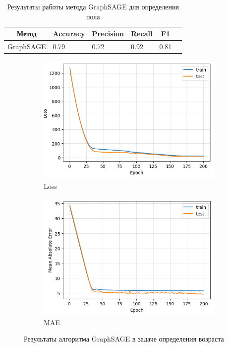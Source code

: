 \begin{table}[t]
\centering
\begin{tabular}{|l|l|l|l|l|l|}
\hline
\multicolumn{1}{|c|}{\textbf{Метод}} & \multicolumn{1}{c|}{\textbf{Accuracy}} & \multicolumn{1}{c|}{\textbf{Precision}} & \multicolumn{1}{c|}{\textbf{Recall}} & \multicolumn{1}{c|}{\textbf{F1}}  \\ \hline
GraphSAGE                       & 0.79                                        &           0.72                              &      0.92                                &     0.81                          \\ \hline

\end{tabular}
\caption{Результаты работы метода GraphSAGE для определения пола}
\label{graphsage gender table}
\end{table}

\begin{figure}[h!]
\begin{subfigure}[h]{0.5\linewidth}
\includegraphics[width=\linewidth]{images/loss_age}
\caption{Loss}
\end{subfigure}
\hfill
\begin{subfigure}[h]{0.5\linewidth}
\includegraphics[width=\linewidth]{images/mae_age}
\caption{MAE}
\end{subfigure}%
\caption{Результаты алгоритма GraphSAGE в задаче определения возраста}
\label{fig:graphsage_age_results}
\end{figure}


